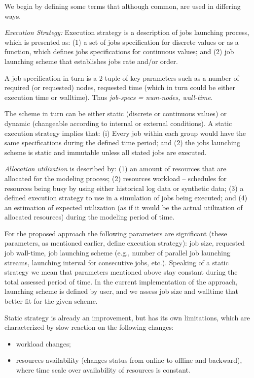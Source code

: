 
We begin by defining some terms that although common, are used in differing
ways. 

\textit{Execution Strategy:} Execution strategy is a description of jobs
launching process, which is presented as: (1) a set of jobs specification for
discrete values or as a function, which defines jobs specifications for
continuous values; and (2) job launching scheme that establishes jobs rate
and/or order.

A job specification in turn is a 2-tuple of key parameters such as a number of
required (or requested) nodes, requested time (which in turn could be either
execution time or walltime). Thus \textit{job-specs = {num-nodes, wall-time}}.

The scheme in turn can be either static (discrete or continuous values) or
dynamic (changeable according to internal or external conditions). A static
execution strategy implies that: (i) Every job within each group would have
the same specifications during the defined time period; and (2) the jobs
launching scheme is static and immutable unless all stated jobs are executed.

\textit{Allocation utilization} is described by: (1) an amount of resources
that are allocated for the modeling process; (2) resources workload --
schedules for resources being busy by using either historical log data or
synthetic data; (3) a defined execution strategy to use in a simulation of
jobs being executed; and (4) an estimation of expected utilization (as if it
would be the actual utilization of allocated resources) during the modeling
period of time.

For the proposed approach the following parameters are significant (these
parameters, as mentioned earlier, define execution strategy): job size,
requested job wall-time, job launching scheme (e.g., number of parallel job
launching streams, launching interval for consecutive jobs, etc.). Speaking
of a static strategy we mean that parameters mentioned above stay constant
during the total assessed period of time. In the current implementation of
the approach, launching scheme is defined by user, and we assess job size
and walltime that better fit for the given scheme.

Static strategy is already an improvement, but has its own limitations,
which are characterized by slow reaction on the following changes:
\begin{itemize}
    \item workload changes;
    \item resources availability (changes status from online to offline and
    backward), where time scale over availability of resources is constant.
\end{itemize}

